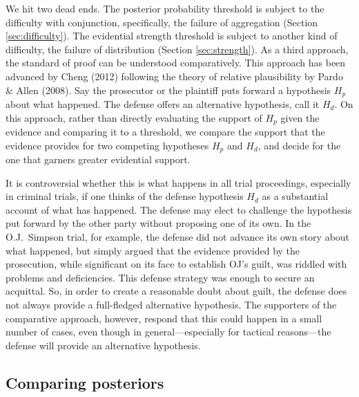 \documentclass[
  10pt,
  dvipsnames,enabledeprecatedfontcommands]{scrartcl}
\begin{document}
\label{sec:comparative}

We hit two dead ends. The posterior probability threshold is subject to
the difficulty with conjunction, specifically, the failure of
aggregation (Section \ref{sec:difficulty}). The evidential strength
threshold is subject to another kind of difficulty, the failure of
distribution (Section \ref{sec:strength}). As a third approach, the
standard of proof can be understood comparatively. This approach has
been advanced by Cheng (2012) following the theory of relative
plausibility by Pardo \& Allen (2008). Say the prosecutor or the
plaintiff puts forward a hypothesis \(H_p\) about what happened. The
defense offers an alternative hypothesis, call it \(H_d\). On this
approach, rather than directly evaluating the support of \(H_p\) given
the evidence and comparing it to a threshold, we compare the support
that the evidence provides for two competing hypotheses \(H_p\) and
\(H_d\), and decide for the one that garners greater evidential support.

It is controversial whether this is what happens in all trial
proceedings, especially in criminal trials, if one thinks of the defense
hypothesis \(H_d\) as a substantial account of what has happened. The
defense may elect to challenge the hypothesis put forward by the other
party without proposing one of its own. In the O.J.~Simpson trial, for
example, the defense did not advance its own story about what happened,
but simply argued that the evidence provided by the prosecution, while
significant on its face to establish OJ's guilt, was riddled with
problems and deficiencies. This defense strategy was enough to secure an
acquittal. So, in order to create a reasonable doubt about guilt, the
defense does not always provide a full-fledged alternative hypothesis.
The supporters of the comparative approach, however, respond that this
could happen in a small number of cases, even though in
general---especially for tactical reasons---the defense will provide an
alternative hypothesis.

\hypertarget{comparing-posteriors}{%
\subsection{Comparing posteriors}\label{comparing-posteriors}}
\end{document}
